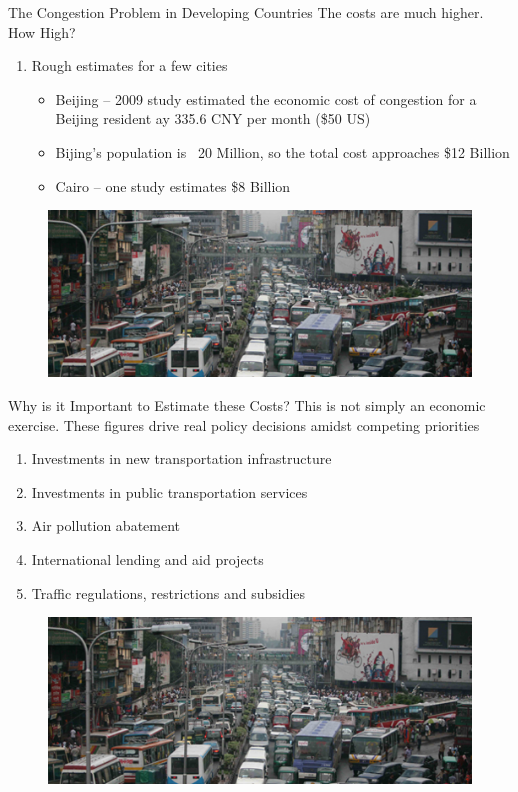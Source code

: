 \documentclass[newPxFont]{beamer}
\begin{document}


\begin{frame}[c]{The Congestion Problem in Developing Countries}
	The costs are much higher. How High?
	\begin{enumerate}   
		\item{Rough estimates for a few cities}
		\begin{itemize}  
			\item{Beijing -- 2009 study estimated the economic cost of congestion for a Beijing resident ay 335.6 CNY per month (\$50 US)}
			\item{Bijing's population is ~20 Million, so the total cost approaches \$12 Billion}
			\item{Cairo -- one study estimates \$8 Billion}
		\end{itemize}  
	\end{enumerate}
	\begin{figure}
		\centering
		\includegraphics[width=.6\linewidth]{traffic.png}
	\end{figure}
\end{frame}



\begin{frame}[c]{Why is it Important to Estimate these Costs?}
	This is not simply an economic exercise.  These figures drive real policy decisions amidst competing priorities
	\begin{enumerate}   
		\item{Investments in new transportation infrastructure}
		\item{Investments in public transportation services}
		\item{Air pollution abatement}
		\item{International lending and aid projects}
		\item{Traffic regulations, restrictions and subsidies}
	\end{enumerate}
	\begin{figure}
		\centering
		\includegraphics[width=.6\linewidth]{traffic.png}
	\end{figure}
\end{frame}
\end{document}

